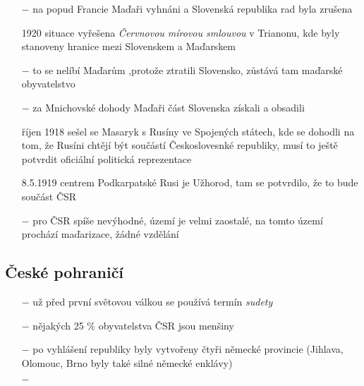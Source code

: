 \documentclass{article}
\begin{document}
\begin{itemize}
    \item[$-$]  na popud Francie Maďaři vyhnáni a Slovenská republika rad byla zrušena
    \item[1920] situace vyřešena \textit{Červnovou mírovou smlouvou} v Trianonu, kde byly stanoveny hranice mezi Slovenskem a Maďarskem
    \item[$-$] to se nelíbí Maďarům ,protože ztratili Slovensko, zůstává tam maďarské obyvatelstvo
    \item[$-$] za Mnichovské dohody Maďaři část Slovenska získali a obsadili
    \item[říjen 1918] sešel se Masaryk s Rusíny ve Spojených státech, kde se dohodli na  tom, že Rusíni chtějí být součástí Českoslovesnké republiky, musí to ještě potvrdit oficiální politická reprezentace
    \item[8.5.1919] centrem Podkarpatské Rusi je Užhorod, tam se potvrdilo, že to bude součást ČSR
    \item[$-$] pro ČSR spíše nevýhodné, území je velmi zaostalé, na tomto území prochází maďarizace, žádné vzdělání
\end{itemize}

\subsection*{České pohraničí}
\begin{itemize}
    \vspace{-0.5em}
    \setlength\itemsep{0.15em}
    \item[$-$] už před první světovou válkou se používá termín \textit{sudety}
    \item[$-$] nějakých 25 \% obyvatelstva ČSR jsou menšiny
    \item[$-$] po vyhlášení republiky byly vytvořeny čtyři německé provincie (Jihlava, Olomouc, Brno byly také silné německé enklávy)
    \item[$-$]
\end{itemize}
\end{document}
